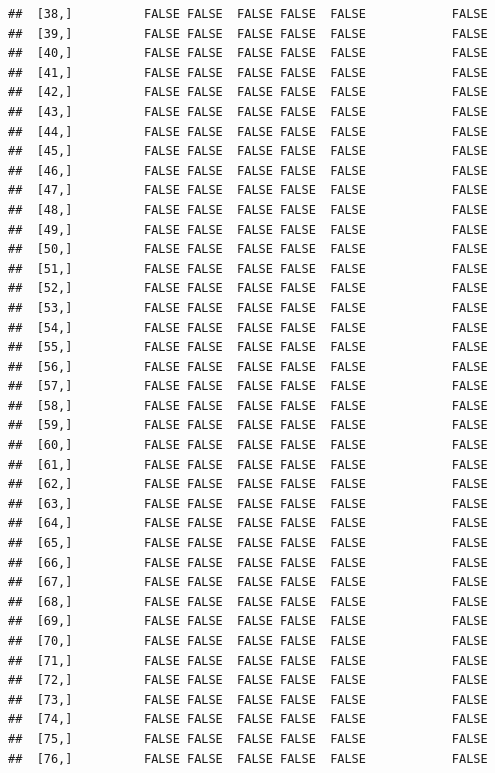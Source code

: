 \documentclass[
  english,
  man,floatsintext]{apa6}
\begin{document}
\begin{verbatim}
##  [38,]          FALSE FALSE  FALSE FALSE  FALSE            FALSE
##  [39,]          FALSE FALSE  FALSE FALSE  FALSE            FALSE
##  [40,]          FALSE FALSE  FALSE FALSE  FALSE            FALSE
##  [41,]          FALSE FALSE  FALSE FALSE  FALSE            FALSE
##  [42,]          FALSE FALSE  FALSE FALSE  FALSE            FALSE
##  [43,]          FALSE FALSE  FALSE FALSE  FALSE            FALSE
##  [44,]          FALSE FALSE  FALSE FALSE  FALSE            FALSE
##  [45,]          FALSE FALSE  FALSE FALSE  FALSE            FALSE
##  [46,]          FALSE FALSE  FALSE FALSE  FALSE            FALSE
##  [47,]          FALSE FALSE  FALSE FALSE  FALSE            FALSE
##  [48,]          FALSE FALSE  FALSE FALSE  FALSE            FALSE
##  [49,]          FALSE FALSE  FALSE FALSE  FALSE            FALSE
##  [50,]          FALSE FALSE  FALSE FALSE  FALSE            FALSE
##  [51,]          FALSE FALSE  FALSE FALSE  FALSE            FALSE
##  [52,]          FALSE FALSE  FALSE FALSE  FALSE            FALSE
##  [53,]          FALSE FALSE  FALSE FALSE  FALSE            FALSE
##  [54,]          FALSE FALSE  FALSE FALSE  FALSE            FALSE
##  [55,]          FALSE FALSE  FALSE FALSE  FALSE            FALSE
##  [56,]          FALSE FALSE  FALSE FALSE  FALSE            FALSE
##  [57,]          FALSE FALSE  FALSE FALSE  FALSE            FALSE
##  [58,]          FALSE FALSE  FALSE FALSE  FALSE            FALSE
##  [59,]          FALSE FALSE  FALSE FALSE  FALSE            FALSE
##  [60,]          FALSE FALSE  FALSE FALSE  FALSE            FALSE
##  [61,]          FALSE FALSE  FALSE FALSE  FALSE            FALSE
##  [62,]          FALSE FALSE  FALSE FALSE  FALSE            FALSE
##  [63,]          FALSE FALSE  FALSE FALSE  FALSE            FALSE
##  [64,]          FALSE FALSE  FALSE FALSE  FALSE            FALSE
##  [65,]          FALSE FALSE  FALSE FALSE  FALSE            FALSE
##  [66,]          FALSE FALSE  FALSE FALSE  FALSE            FALSE
##  [67,]          FALSE FALSE  FALSE FALSE  FALSE            FALSE
##  [68,]          FALSE FALSE  FALSE FALSE  FALSE            FALSE
##  [69,]          FALSE FALSE  FALSE FALSE  FALSE            FALSE
##  [70,]          FALSE FALSE  FALSE FALSE  FALSE            FALSE
##  [71,]          FALSE FALSE  FALSE FALSE  FALSE            FALSE
##  [72,]          FALSE FALSE  FALSE FALSE  FALSE            FALSE
##  [73,]          FALSE FALSE  FALSE FALSE  FALSE            FALSE
##  [74,]          FALSE FALSE  FALSE FALSE  FALSE            FALSE
##  [75,]          FALSE FALSE  FALSE FALSE  FALSE            FALSE
##  [76,]          FALSE FALSE  FALSE FALSE  FALSE            FALSE

\end{verbatim}
\end{document}
